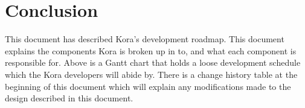 \documentclass[onecolumn, draftclsnofoot,10pt, compsoc]{IEEEtran}
\begin{document}
			
\section{Conclusion}
	This document has described Kora's development roadmap.
	This document explains the components Kora is broken up in to, and what each component is responsible for.
	Above is a Gantt chart that holds a loose development schedule which the Kora developers will abide by.
	There is a change history table at the beginning of this document which will explain any modifications made to the design described in this document.



%
%
\end{document}
